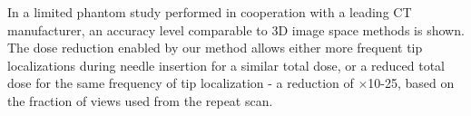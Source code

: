 In a limited phantom study performed in cooperation with a leading CT manufacturer, an accuracy level comparable to 3D image space methods is shown.
The dose reduction enabled by our method allows either more frequent tip localizations during needle insertion for a similar total dose, or a reduced total dose for the same frequency of tip localization - a reduction of $\times$10-25, based on the fraction of views used from the repeat scan.






